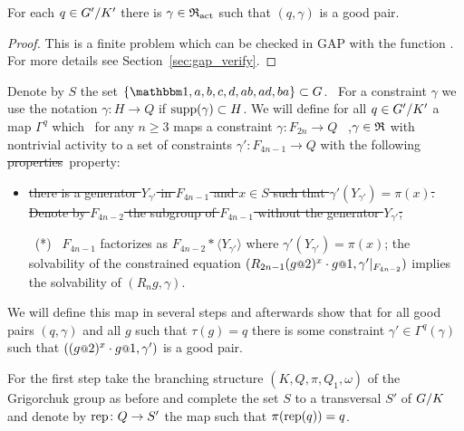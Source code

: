 \documentclass[a4paper,11pt]{amsart}
\newcommand\replaceTh[2]{\st{#1}{\color{DeepPink1}\ #2}}
\newcommand\replace[2]{\st{#1}{\color{Green4}\ #2}}
\begin{document}
\begin{lem} \label{lem:existsGoodGamma}
 For each $q\in{G'/K'}$ there is $\gamma\in \mathfrak{R}_{\operatorname{act}}$ such that $(q,\gamma)$ is a 
 good pair.
\end{lem}
\begin{proof}
 This is a finite problem which can be checked in GAP with the function .
 For more details see Section~\ref{sec:gap_verify}.
\end{proof}

Denote by $S$ the set $\{\id,a,b,c,d,ab,ad,ba\}\subset G$.
\replace{}{For a constraint $\gamma$ we use the notation $\gamma: H \to Q$ if $\operatorname{{supp}}(\gamma) \subset H$.}
We will define for all $q\in {G'/K'}$ a map $\Gamma^q$ which \replace{}{for any $n \ge 3$} maps a constraint
$\gamma\colon F_{2n} \to Q$ \replaceTh{}{,$\gamma\in \mathfrak{R}$} with nontrivial activity to a set of constraints $\gamma'\colon F_{4n-1}\to Q$
with the following \replace{properties}{property}:
\begin{itemize}
  \item \replace{there is a generator $Y_{\gamma'}$ in $F_{4n-1}$ and $x\in S$ such that $\gamma'(Y_{\gamma'})=\pi(x)$.
  Denote by $F_{4n-2}$ the subgroup of $F_{4n-1}$ without the generator $Y_{\gamma'}$;}{}
  \item[\replace{}{(*)}]
  \replace{}{$F_{4n-1}$ factorizes as $F_{4n-2} * \langle Y_{\gamma'} \rangle$ where $\gamma'(Y_{\gamma'})=\pi(x)$;}
  the solvability of the constrained equation $(R_{2n-1} (g\at{2})^x \cdot g\at{1},\gamma'|_{F_{4n-2}})$
  implies the solvability of $(R_ng,\gamma)$.
 \end{itemize}

 We will define this map in several steps and afterwards show that for all good 
 pairs $(q,\gamma)$ and all $g$ such that $\tau(g)=q$ there is some constraint 
 $\gamma' \in \Gamma^q(\gamma)$ such that $((g\at{2})^x \cdot g\at{1},\gamma')$ is a good pair.
 
 For the first step take the branching structure $(K,Q,\pi,Q_1,\omega)$ of the 
 Grigorchuk group as before and complete the set $S$ to a transversal $S'$ 
 of ${G/K}$ and denote by $\operatorname{rep}\colon Q\to S'$  the map such that 
 $\pi(\operatorname{rep}(q)) = q$.
 
\end{document}

